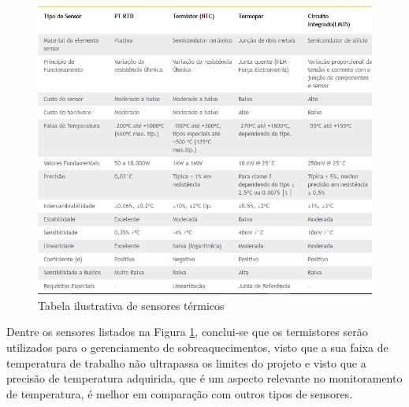 \begin{figure}[!h]
	\centering
	\includegraphics[width=1.0\textwidth]{figuras/tabelaSensoresTermicos.png}
	\caption{Tabela ilustrativa de sensores térmicos}
	\label{fig:sensorestermicos}
\end{figure}

Dentre os sensores listados na Figura \ref{fig:sensorestermicos}, conclui-se que os termistores serão utilizados para o gerenciamento de sobreaquecimentos, visto que a sua faixa de temperatura de trabalho não ultrapassa os limites do projeto e visto que a precisão de temperatura adquirida, que é um aspecto relevante no monitoramento de temperatura, é melhor em comparação com outros tipos de sensores.



